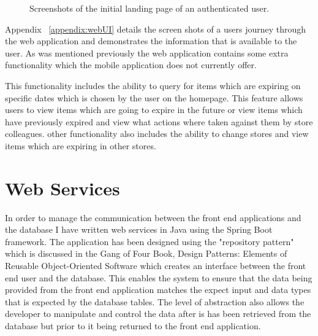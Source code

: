 \documentclass[a4paper,11pt]{report}
\begin{document}
\begin{figure}[H]
    \centering
    \caption{Screenshots of the initial landing page of an authenticated user.}
    \label{fig:WebUi}
\end{figure}

Appendix ~\ref{appendix:webUI} details the screen shots of a users journey through the web application and demonstrates the information that is available to the user.
As was mentioned previously the web application contains some extra functionality which the mobile application does not currently offer.

This functionality includes the ability to query for items which are expiring on specific dates which is chosen by the user on the homepage. This feature allows users to view items which are going to expire in the future or view items which have previously expired and view what actions where taken against them by store colleagues.
other functionality also includes the ability to change stores and view items which are expiring in other stores. 

\section{Web Services}
In order to manage the communication between the front end applications and the database I have written web services in Java using the Spring Boot framework. 
The application has been designed using the "repository pattern" which is discussed in the Gang of Four Book, Design Patterns: Elements of Reusable Object-Oriented Software\cite{gamma1994design} which creates an interface between the front end user and the database. This enables the system to ensure that the data being provided from the front end application matches the expect input and data types that is expected by the database tables. The level of abstraction also allows the developer to manipulate and control the data after is has been retrieved from the database but prior to it being returned to the front end application.
\end{document}
